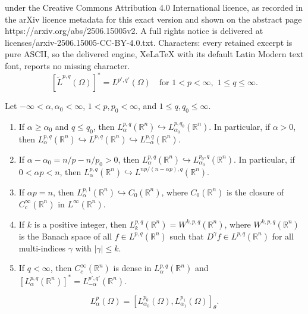 \documentclass[10pt,a4paper]{amsart}
\newcommand{\R}{{\mathbb{R}}}
\begin{document}
under the Creative Commons Attribution 4.0 International licence, as recorded in the arXiv licence metadata for this exact version and shown on the abstract page https://arxiv.org/abs/2506.15005v2. A full rights notice is delivered at licenses/arxiv-2506.15005-CC-BY-4.0.txt. Characters: every retained excerpt is pure ASCII, so the delivered engine, XeLaTeX with its default Latin Modern text font, reports no missing character.
\begin{equation}\label{widehat-L}
\left[ \widetilde{L}^{p,q} (\Omega )\right]^*
= L^{p',q'} (\Omega )  \quad\mbox{for}\,\, 1<p<\infty, \,\,1 \le q \le \infty.
\end{equation}

\begin{lem}\label{properties of SL on Rn} Let $ -\infty<  \alpha, \alpha_0 < \infty$,  $1< p , p_0< \infty$, and    $1 \le q, q_0 \le \infty$.
\begin{enumerate}[{\upshape (i)}]
\item  If $\alpha  \ge \alpha_0$  and $q \le q_0 $, then   $L_\alpha^{p,q}(\R^n ) \hookrightarrow L_{\alpha_0}^{p,q_0 }(\R^n )  $. In particular, if $\alpha > 0$, then $L_\alpha^{p,q}(\R^n ) \hookrightarrow L^{p,q  }(\R^n )\hookrightarrow L_{-\alpha}^{p,q}(\R^n )$.
\item  If $\alpha-\alpha_0 = n/p-n/p_0 >0$, then $L_\alpha^{p,q}(\R^n)\hookrightarrow L_{\alpha_0}^{p_0 , q}(\R^n)$. In particular, if $0<  \alpha p < n $, then $L_\alpha^{p,q}(\R^n)\hookrightarrow L^{np/(n-\alpha p),q}(\R^n)$.
\item   If $\alpha p=n$, then $L_\alpha^{p,1}(\R^n)\hookrightarrow C_0 (\R^n )$, where $C_0 (\R^n )$ is the closure of $C_c^\infty (\R^n)$ in $L^\infty (\R^n )$.
\item   If $k$ is a positive integer, then $L_k^{p,q}(\R^n) =W^{k,p,q}(\R^n )$, where $W^{k,p,q}(\R^n )$ is the Banach space  of  all $f \in L^{p,q}(\R^n )$ such that $D^\gamma f \in L^{p,q}(\R^n )$ for all multi-indices $\gamma$ with $|\gamma | \le k$.
\item  If $q < \infty$, then $C_c^\infty (\R^n)$ is dense in  $L_\alpha^{p,q}(\R^n)$ and $\left[L_\alpha^{p,q}(\R^n) \right]^* = L_{-\alpha}^{p',q'}(\R^n)$.
\end{enumerate}
\end{lem}

\begin{equation}\label{complex interp for S}
L_{\alpha}^{p} (\Omega )  = \left[ L_{\alpha_0}^{p_0} (\Omega ) ,L_{\alpha_1}^{p_1} (\Omega ) \right]_{\theta}  .
\end{equation}
\end{document}

